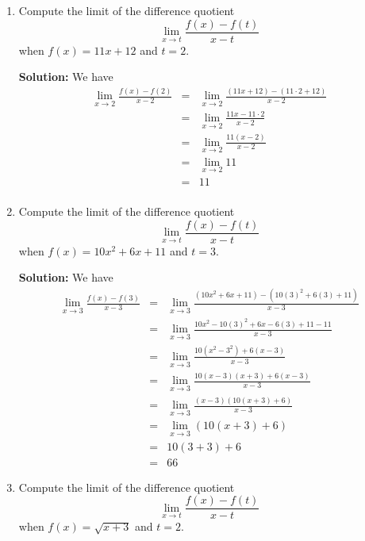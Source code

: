 \documentclass{article}
\begin{document}
\ActivityTitle[class=Calculus I, number=2, name=Continuity (Solutions)]

\begin{enumerate}
\item Compute the limit of the difference quotient \[ \lim_{x \rightarrow t} \frac{f(x) - f(t)}{x - t} \] when $f(x) = 11 x + 12$ and $t = 2$.

\textbf{Solution:} We have
\begin{eqnarray*}
\lim_{x \rightarrow 2} \frac{f(x) - f(2)}{x - 2} & = & \lim_{x \rightarrow 2} \frac{(11 x + 12) - (11 \cdot 2 + 12)}{x - 2} \\
 & = & \lim_{x \rightarrow 2} \frac{11 x - 11 \cdot 2}{x - 2} \\
 & = & \lim_{x \rightarrow 2} \frac{11(x - 2)}{x - 2} \\
 & = & \lim_{x \rightarrow 2} 11 \\
 & = & 11 \\
\end{eqnarray*}


  
\vspace{1cm}

\item Compute the limit of the difference quotient \[ \lim_{x \rightarrow t} \frac{f(x) - f(t)}{x - t} \] when $f(x) = 10 x^2 + 6 x + 11$ and $t = 3$.

\textbf{Solution:} We have
\begin{eqnarray*}
\lim_{x \rightarrow 3} \frac{f(x) - f(3)}{x - 3} & = & \lim_{x \rightarrow 3} \frac{(10 x^2 + 6 x + 11) - (10 (3)^2 + 6(3) + 11)}{x - 3} \\
 & = & \lim_{x \rightarrow 3} \frac{10 x^2 - 10(3)^2 + 6 x - 6(3) + 11 - 11}{x - 3} \\
 & = & \lim_{x \rightarrow 3} \frac{10(x^2 - 3^2) + 6(x - 3)}{x - 3} \\
 & = & \lim_{x \rightarrow 3} \frac{10(x - 3)(x + 3) + 6(x - 3)}{x - 3} \\
 & = & \lim_{x \rightarrow 3} \frac{(x - 3)(10(x + 3) + 6)}{x - 3} \\
 & = & \lim_{x \rightarrow 3} \left( 10(x + 3) + 6 \right) \\
 & = & 10(3 + 3) + 6\\
 & = & 66
\end{eqnarray*}


  
\vspace{1cm}

\item Compute the limit of the difference quotient \[ \lim_{x \rightarrow t} \frac{f(x) - f(t)}{x - t} \] when $f(x) = \sqrt{x + 3}$ and $t = 2$.


\end{enumerate}
\end{document}
